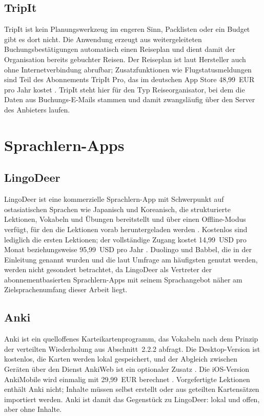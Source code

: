 \documentclass[12pt,a4paper]{scrreprt}
\begin{document}
\subsection{TripIt}
TripIt ist kein Planungswerkzeug im engeren Sinn, Packlisten oder ein Budget gibt es dort nicht. Die Anwendung erzeugt aus weitergeleiteten Buchungsbestätigungen automatisch einen Reiseplan und dient damit der Organisation bereits gebuchter Reisen. Der Reiseplan ist laut Hersteller auch ohne Internetverbindung abrufbar; Zusatzfunktionen wie Flugstatusmeldungen sind Teil des Abonnements TripIt Pro, das im deutschen App Store 48,99~EUR pro Jahr kostet \cite{tripitappstore}. TripIt steht hier für den Typ Reiseorganisator, bei dem die Daten aus Buchungs-E-Mails stammen und damit zwangsläufig über den Server des Anbieters laufen.

\section{Sprachlern-Apps}

\subsection{LingoDeer}
LingoDeer ist eine kommerzielle Sprachlern-App mit Schwerpunkt auf ostasiatischen Sprachen wie Japanisch und Koreanisch, die strukturierte Lektionen, Vokabeln und Übungen bereitstellt und über einen Offline-Modus verfügt, für den die Lektionen vorab heruntergeladen werden \cite{lingodeerappstore}. Kostenlos sind lediglich die ersten Lektionen; der vollständige Zugang kostet 14,99~USD pro Monat beziehungsweise 95,99~USD pro Jahr \cite{lingodeerpricing}. Duolingo und Babbel, die in der Einleitung genannt wurden und die laut Umfrage am häufigsten genutzt werden, werden nicht gesondert betrachtet, da LingoDeer als Vertreter der abonnementbasierten Sprachlern-Apps mit seinem Sprachangebot näher am Zielsprachenumfang dieser Arbeit liegt.

\subsection{Anki}
Anki ist ein quelloffenes Karteikartenprogramm, das Vokabeln nach dem Prinzip der verteilten Wiederholung aus Abschnitt~2.2.2 abfragt. Die Desktop-Version ist kostenlos, die Karten werden lokal gespeichert, und der Abgleich zwischen Geräten über den Dienst AnkiWeb ist ein optionaler Zusatz \cite{anki}. Die iOS-Version AnkiMobile wird einmalig mit 29,99~EUR berechnet \cite{ankimobile}. Vorgefertigte Lektionen enthält Anki nicht; Inhalte müssen selbst erstellt oder aus geteilten Kartensätzen importiert werden. Anki ist damit das Gegenstück zu LingoDeer: lokal und offen, aber ohne Inhalte.
\end{document}
